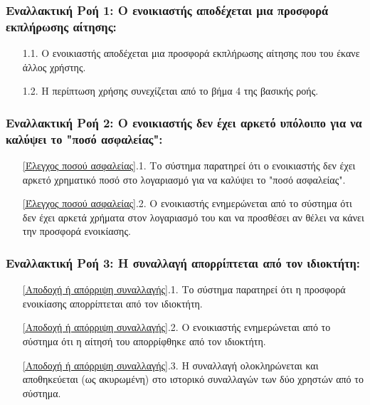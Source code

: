 \documentclass[12pt,a4paper]{article}
\begin{document}
\subsubsection*{Εναλλακτική Ροή 1: Ο ενοικιαστής αποδέχεται μια προσφορά εκπλήρωσης αίτησης:}
\begin{enumerate}
    \item[1.1.] Ο ενοικιαστής αποδέχεται μια προσφορά εκπλήρωσης αίτησης που του έκανε άλλος χρήστης.
    \item[1.2.] Η περίπτωση χρήσης συνεχίζεται από το βήμα 4 της βασικής ροής.
\end{enumerate}

\subsubsection*{Εναλλακτική Ροή 2: Ο ενοικιαστής δεν έχει αρκετό υπόλοιπο για να καλύψει το "ποσό ασφαλείας":}
\begin{enumerate}
    \item[\ref{Έλεγχος ποσού ασφαλείας}.1.] Το σύστημα παρατηρεί ότι ο ενοικιαστής δεν έχει αρκετό χρηματικό ποσό στο λογαριασμό για να καλύψει το "ποσό ασφαλείας".
    \item[\ref{Έλεγχος ποσού ασφαλείας}.2.] Ο ενοικιαστής ενημερώνεται από το σύστημα ότι δεν έχει αρκετά χρήματα στον λογαριασμό του και να προσθέσει αν θέλει να κάνει την προσφορά ενοικίασης.
\end{enumerate}

\subsubsection*{Εναλλακτική Ροή 3: Η συναλλαγή απορρίπτεται από τον ιδιοκτήτη:}
\begin{enumerate}
    \item[\ref{Αποδοχή ή απόρριψη συναλλαγής}.1.] Το σύστημα παρατηρεί ότι η προσφορά ενοικίασης απορρίπτεται από τον ιδιοκτήτη.
    \item[\ref{Αποδοχή ή απόρριψη συναλλαγής}.2.] Ο ενοικιαστής ενημερώνεται από το σύστημα ότι η αίτησή του απορρίφθηκε από τον ιδιοκτήτη.
    \item[\ref{Αποδοχή ή απόρριψη συναλλαγής}.3.] Η συναλλαγή ολοκληρώνεται και αποθηκεύεται (ως ακυρωμένη) στο ιστορικό συναλλαγών των δύο χρηστών από το σύστημα.
\end{enumerate}
\end{document}
